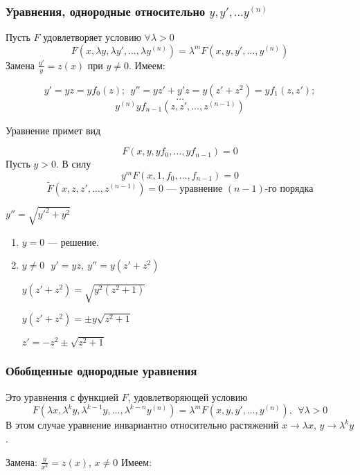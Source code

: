   \subsubsection{Уравнения, однородные относительно $y, y', \ldots y^{(n)}$}
  Пусть $F$ удовлетворяет условию $\forall \lambda > 0$
  \begin{equation}
  \label{three.four}
  F(x , \lambda y, \lambda y', \ldots, \lambda y^{(n)}) = \lambda^m F(x , y, y', \ldots, y^{(n)})
  \end{equation}
  Замена $\frac{y'}{y} = z(x)$ при $y \neq 0$. Имеем:

  \[ y' = yz = yf_0(z);~~ y'' = yz' + y'z = y(z' + z^2) = yf_1(z, z'); \]
  \[\ldots\]
  \[y ^{(n)} yf_{n-1}(z, z', \ldots, z^{(n-1)}) \]

  \noindent Уравнение  примет вид

  \[ F(x, y, yf_0, \ldots, yf_{n - 1}) = 0 \]
  Пусть $y > 0$. В силу 
  \[ y^mF(x, 1, f_0, \ldots, f_{n-1}) = 0\]
  \[\tilde{F}(x, z, z', \ldots, z^{(n-1)}) = 0 \text{ --- уравнение $(n-1)$-го порядка}\]
  \begin{xmp}{$y'' = \sqrt{y'^2 + y^2}$}
  \begin{enumerate}
  \item $y = 0$ --- решение.
  \item $y \neq 0 ~~~ y' = yz,~ y'' = y(z' + z^2)$

  \noindent $y(z' + z^2) = \sqrt{y^2(z^2 + 1)}$

  \noindent $y(z' + z^2) = \pm y\sqrt{z^2 + 1}$

  \noindent $z' = -z^2 \pm \sqrt{z^2 + 1}$
  \end{enumerate}
  \end{xmp}

  \subsubsection{Обобщенные однородные уравнения}
  Это уравнения  с функцией $F$, удовлетворяющей условию
  \begin{equation}
  \label{three.five}
  F(\lambda x, \lambda^ky, \lambda^{k - 1}y, \ldots, \lambda^{k - n}y^{(n)}) = \lambda^m F(x, y, y', \ldots, y^{(n)}),~~ \forall \lambda > 0
  \end{equation}
  В этом случае уравнение  инвариантно относительно растяжений $x \rightarrow \lambda x$, $y \rightarrow \lambda^k y$.

  \noindent Замена: $\frac{y}{x^k} = z(x)$, $x \neq 0$ Имеем:

